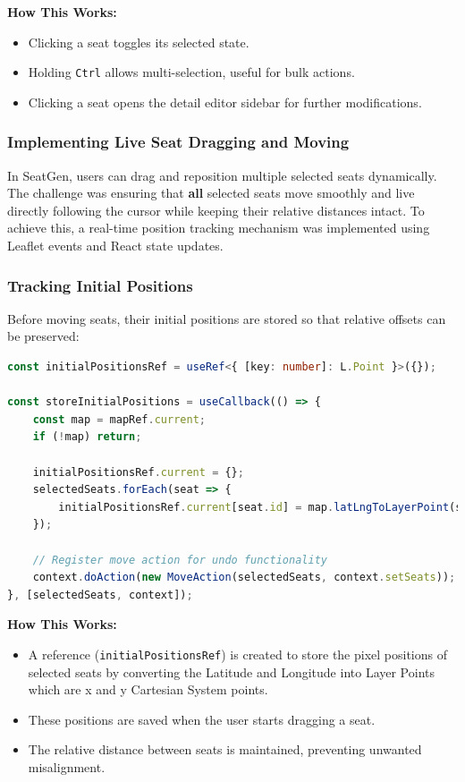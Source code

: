 \textbf{How This Works:}
\begin{itemize}
    \item Clicking a seat toggles its selected state.
    \item Holding \texttt{Ctrl} allows multi-selection, useful for bulk actions.
    \item Clicking a seat opens the detail editor sidebar for further modifications.
\end{itemize}


\subsubsection{Implementing Live Seat Dragging and Moving}

In SeatGen, users can drag and reposition multiple selected seats dynamically. The challenge was ensuring that \textbf{all} selected seats move smoothly and live directly following the cursor while keeping their relative distances intact. To achieve this, a real-time position tracking mechanism was implemented using Leaflet events and React state updates.

\subsubsection{Tracking Initial Positions}
Before moving seats, their initial positions are stored so that relative offsets can be preserved:

\begin{lstlisting}[language=TypeScript, caption=Storing Initial Positions Before Dragging, label=lst:seat-initial-pos]
const initialPositionsRef = useRef<{ [key: number]: L.Point }>({});

const storeInitialPositions = useCallback(() => {
    const map = mapRef.current;
    if (!map) return;

    initialPositionsRef.current = {};
    selectedSeats.forEach(seat => {
        initialPositionsRef.current[seat.id] = map.latLngToLayerPoint(seat.position);
    });

    // Register move action for undo functionality
    context.doAction(new MoveAction(selectedSeats, context.setSeats));
}, [selectedSeats, context]);
\end{lstlisting}

\textbf{How This Works:}
\begin{itemize}
    \item A reference (\texttt{initialPositionsRef}) is created to store the pixel positions of selected seats by converting the Latitude and Longitude into Layer Points which are x and y Cartesian System points.
    \item These positions are saved when the user starts dragging a seat.
    \item The relative distance between seats is maintained, preventing unwanted misalignment.
\end{itemize}

